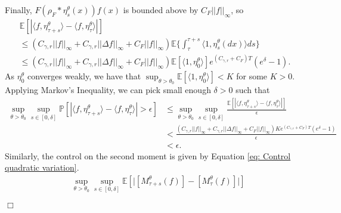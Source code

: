 \documentclass[12pt]{article}
\newenvironment {proof}{{\noindent\bf Proof }}{\hfill $\Box$ \medskip}
\begin{document}
\begin{proof}
Finally,  $F(\rho_{F}*\eta^{\theta}_{s}(x)) f(x)$ is bounded above by $C_F||f||_{\infty}$, so 
\begin{multline}
\mathbb{E}\left[\left|
                        \langle f, \eta^{\theta}_{\tau+s}\rangle - \langle f, \eta^{\theta}_{\tau}\rangle
                \right|\right] \\
\leq (C_{\gamma,r}||f||_{\infty}
        + C_{\gamma,r}||\Delta f||_{\infty}
            +C_F||f||_{\infty})
    \mathbb{E}\bigg\{
                        \int_{\tau}^{\tau+s}
                        \bigg\langle 1,\eta^{\theta}_{s}(dx)  \bigg\rangle 
                        ds
                \bigg\} \\
\leq (C_{\gamma,r}||f||_{\infty}
            + C_{\gamma,r}||\Delta f||_{\infty}
                    +C_F||f||_{\infty})
                \mathbb{E}[\langle 1 ,\eta^{\theta}_{0}\rangle]
                        e^{(C_{\gamma,r}+C_F)T}(e^\delta-1).
\end{multline}
As $\eta^{\theta}_0$ converges weakly,
we have that 
$\sup_{\theta > \theta_0}\mathbb{E}[\langle 1 ,\eta^{\theta}_{0}\rangle] < K$
for some $K>0$.
Applying Markov's Inequality,
we can pick small enough $\delta > 0$ such that 
\begin{equation}
\begin{aligned}
\sup_{\theta > \theta_0}
\sup_{s \in [0, \delta]}
\mathbb{P}\left[\left| \langle f, \eta^{\theta}_{\tau+s}\rangle
                        - \langle f, \eta^{\theta}_{\tau}\rangle
                \right|> \epsilon \right]
& \leq \sup_{\theta > \theta_0}
\sup_{s \in [0, \delta]}
\frac{
\mathbb{E}\left[\left| \langle f, \eta^{\theta}_{\tau+s}\rangle
                        - \langle f, \eta^{\theta}_{\tau}\rangle
                \right| \right]
        }{\epsilon}\\
& < \frac{(C_{\gamma,r}||f||_{\infty}
            + C_{\gamma,r}||\Delta f||_{\infty}
                    +C_F||f||_{\infty})
                Ke^{(C_{\gamma,r}+C_F)T}(e^\delta-1)
         }{\epsilon}\\
& < \epsilon.
\end{aligned}    
\end{equation}
Similarly, the control on the second moment is given by Equation \eqref{eq: Control quadratic variation}.
\begin{equation}
    \label{eq: Controlling Quadratic Jumps}
\begin{aligned}
& \sup_{\theta > \theta_0}
\sup_{s \in [0, \delta]}\mathbb{E}\left[\big| [M^{\theta}_{\tau+s}(f)] - [M^{\theta}_{\tau}(f)] \big|\right]\\

\end{aligned}
\end{equation}
\end{proof}
\end{document}
